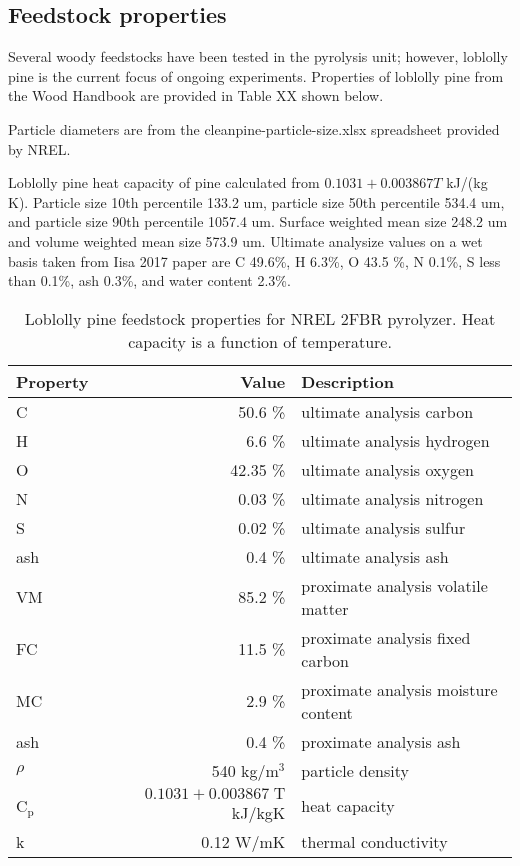 \subsection{Feedstock properties}

Several woody feedstocks have been tested in the pyrolysis unit; however, loblolly pine is the current focus of ongoing experiments. Properties of loblolly pine from the Wood Handbook are provided in Table XX shown below.

Particle diameters are from the cleanpine-particle-size.xlsx spreadsheet provided by NREL.

Loblolly pine heat capacity of pine calculated from $0.1031 + 0.003867 T$ kJ/(kg K). Particle size 10th percentile 133.2 um, particle size 50th percentile 534.4 um, and particle size 90th percentile 1057.4 um. Surface weighted mean size 248.2 um and volume weighted mean size 573.9 um. Ultimate analysize values on a wet basis taken from Iisa 2017 paper are C 49.6\%, H 6.3\%, O 43.5 \%, N 0.1\%, S less than 0.1\%, ash 0.3\%, and water content 2.3\%.

\begin{table}[H]
    \centering
    \caption{Loblolly pine feedstock properties for NREL 2FBR pyrolyzer. Heat capacity is a function of temperature.}
    \label{tab:feedstock}
    \begin{tabular}{lrl}
        \toprule
        Property & Value & Description \\
        \midrule
        C & 50.6 \% & ultimate analysis carbon \\
        H & 6.6 \% & ultimate analysis hydrogen \\
        O & 42.35 \% & ultimate analysis oxygen \\
        N & 0.03 \% & ultimate analysis nitrogen \\
        S & 0.02 \% & ultimate analysis sulfur \\
        ash & 0.4 \% & ultimate analysis ash \\
        VM & 85.2 \% & proximate analysis volatile matter \\
        FC & 11.5 \% & proximate analysis fixed carbon \\
        MC & 2.9 \% & proximate analysis moisture content \\
        ash & 0.4 \% & proximate analysis ash \\
        $\rho$ & 540 kg/m$^3$ & particle density \\
        C$_\textrm{p}$ & $0.1031 + 0.003867\;\textrm{T}$ kJ/kgK & heat capacity \\
        k & 0.12 W/mK & thermal conductivity \\
        \bottomrule
    \end{tabular}
\end{table}

